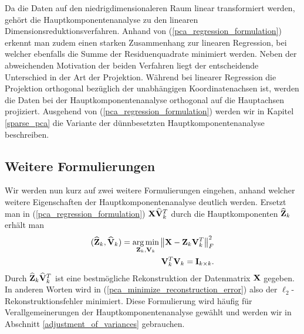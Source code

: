 Da die Daten auf den niedrigdimensionaleren Raum linear transformiert werden, gehört die Hauptkomponentenanalyse zu den linearen Dimensionsreduktionsverfahren. Anhand von (\ref{pca_regression_formulation}) erkennt man zudem einen starken Zusammenhang zur linearen Regression, bei welcher ebenfalls die Summe der Residuenquadrate minimiert werden. Neben der abweichenden Motivation der beiden Verfahren liegt der entscheidende Unterschied in der Art der Projektion. Während bei linearer Regression die Projektion orthogonal bezüglich der unabhängigen Koordinatenachsen ist, werden die Daten bei der Hauptkomponentenanalyse orthogonal auf die Hauptachsen projiziert. Ausgehend von (\ref{pca_regression_formulation}) werden wir in Kapitel \ref{sparse_pca} die Variante der dünnbesetzten Hauptkomponentenanalyse beschreiben.

\subsection{Weitere Formulierungen} 

Wir werden nun kurz auf zwei weitere Formulierungen eingehen, anhand welcher weitere Eigenschaften der Hauptkomponentenanalyse deutlich werden. Ersetzt man in (\ref{pca_regression_formulation}) $\mathbf{X} \widehat{\mathbf{V}}_k^T$ durch die Hauptkomponenten $\widehat{\mathbf{Z}}_k$ erhält man
\begin{align}
\label{pca_minimize_reconstruction_error}
\begin{split}
(\widehat{\mathbf{Z}}_k, \widehat{\mathbf{V}}_k) = \operatorname*{arg\,min}_{\mathbf{Z}_k, \mathbf{V}_k} \left\lVert \mathbf{X} - \mathbf{Z}_k \mathbf{V}_k^T \right\rVert_{F}^{2}\\
\mathbf{V}_k^T\mathbf{V}_k = \mathbf{I}_{k \times k}.
\end{split}
\end{align}
Durch $\widehat{\mathbf{Z}}_k \widehat{\mathbf{V}}_k^T$ ist eine bestmögliche Rekonstruktion der Datenmatrix $\mathbf{X}$ gegeben. In anderen Worten wird in (\ref{pca_minimize_reconstruction_error}) also der $\ell_2$-Rekonstruktionsfehler minimiert. Diese Formulierung wird häufig für Verallgemeinerungen der Hauptkomponentenanalyse gewählt und werden wir in Abschnitt \ref{adjustment_of_variances} gebrauchen.

